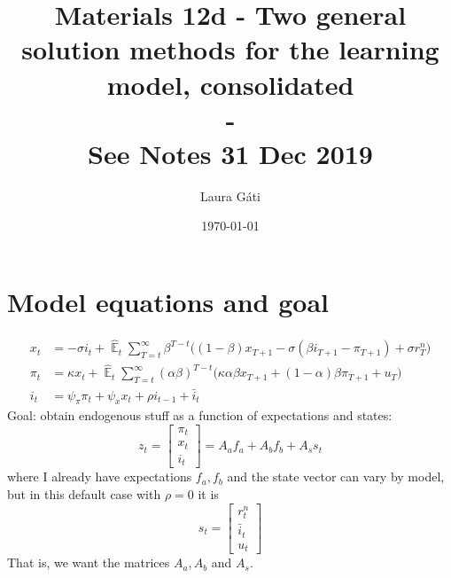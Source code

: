 \documentclass[11pt]{article}
\renewcommand{\[}{\begin{equation}}
\renewcommand{\]}{\end{equation}}
\DeclareMathOperator{\E}{\mathbb{E}}
\begin{document}
\linespread{1.0}

\title{Materials 12d - Two general solution methods for the learning model, consolidated \\
- 
\\
\small{See Notes 31 Dec 2019}}
\author{Laura G\'ati} 
\date{\today}
\maketitle




\section{Model equations and goal}
\begin{align}
x_t &=  -\sigma i_t +\hat{\E}_t \sum_{T=t}^{\infty} \beta^{T-t }\big( (1-\beta)x_{T+1} - \sigma(\beta i_{T+1} - \pi_{T+1}) +\sigma r_T^n \big)  \label{prestons18}  \\
\pi_t &= \kappa x_t +\hat{\E}_t \sum_{T=t}^{\infty} (\alpha\beta)^{T-t }\big( \kappa \alpha \beta x_{T+1} + (1-\alpha)\beta \pi_{T+1} + u_T\big) \label{prestons19}  \\
i_t &= \psi_{\pi}\pi_t + \psi_{x} x_t  + \rho i_{t-1} + \bar{i}_t \label{TR}
\end{align}
Goal: obtain endogenous stuff as a function of expectations and states:
\begin{equation}
z_t = \begin{bmatrix} \pi_t \\ x_t \\ i_t \end{bmatrix} = A_a f_{a} + A_b f_{b} + A_s s_t
\end{equation}
where I already have expectations $f_a, f_b$ and the state vector can vary by model, but in this default case with $\rho=0$ it is \begin{equation}
s_t = \begin{bmatrix} r_t^n \\ \bar{i}_t \\ u_t \end{bmatrix}
\end{equation}
That is,  we want the matrices $A_a, A_b$ and $A_s$.
\end{document}
